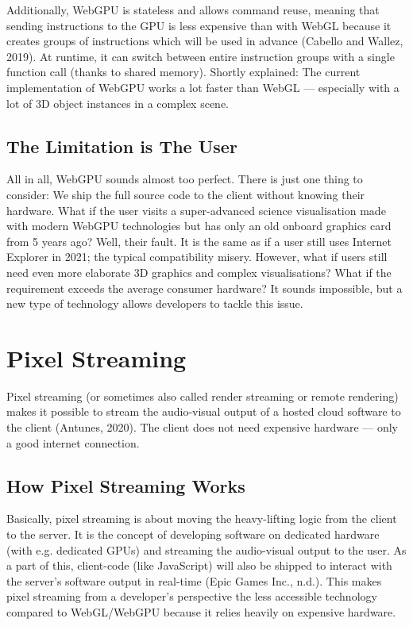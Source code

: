\documentclass[10pt]{article}
\begin{document}
\begin{sloppypar}
  Additionally, WebGPU is stateless and allows command reuse, meaning that sending instructions to the GPU is less expensive than with WebGL because it creates groups of instructions which will be used in advance (Cabello and Wallez, 2019). At runtime, it can switch between entire instruction groups with a single function call (thanks to shared memory). Shortly explained: The current implementation of WebGPU works a lot faster than WebGL — especially with a lot of 3D object instances in a complex scene.

  \subsection{The Limitation is The User}
  \label{subsec:the-limitation-is-the-user}

  All in all, WebGPU sounds almost too perfect. There is just one thing to consider: We ship the full source code to the client without knowing their hardware. What if the user visits a super-advanced science visualisation made with modern WebGPU technologies but has only an old onboard graphics card from 5 years ago? Well, their fault. It is the same as if a user still uses Internet Explorer in 2021; the typical compatibility misery. However, what if users still need even more elaborate 3D graphics and complex visualisations? What if the requirement exceeds the average consumer hardware? It sounds impossible, but a new type of technology allows developers to tackle this issue.

  \section{Pixel Streaming}
  \label{sec:pixel-streaming}

  Pixel streaming (or sometimes also called render streaming or remote rendering) makes it possible to stream the audio-visual output of a hosted cloud software to the client (Antunes, 2020). The client does not need expensive hardware — only a good internet connection.

  \subsection{How Pixel Streaming Works}
  \label{subsec:how-pixel-streaming-works}

  Basically, pixel streaming is about moving the heavy-lifting logic from the client to the server. It is the concept of developing software on dedicated hardware (with e.g. dedicated GPUs) and streaming the audio-visual output to the user. As a part of this, client-code (like JavaScript) will also be shipped to interact with the server’s software output in real-time (Epic Games Inc., n.d.). This makes pixel streaming from a developer’s perspective the less accessible technology compared to WebGL/WebGPU because it relies heavily on expensive hardware.


\end{sloppypar}
\end{document}
